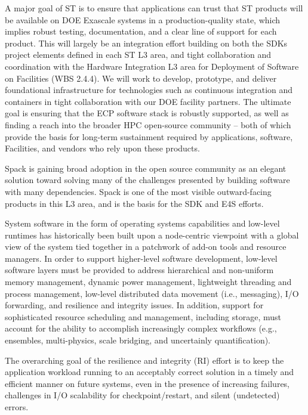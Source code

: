 A major goal of ST is to ensure that applications can trust that ST products will be available on DOE Exascale systems in a production-quality state, which implies robust testing, documentation, and a clear line of support for each product. This will largely be an integration effort building on both the SDKs project elements defined in each ST L3 area, and tight collaboration and coordination with the Hardware Integration L3 area for Deployment of Software on Facilities (WBS 2.4.4). We will work to develop, prototype, and deliver foundational infrastructure for technologies such as continuous integration and containers in tight collaboration with our DOE facility partners. The ultimate goal is ensuring that the ECP software stack is robustly supported, as well as finding a reach into the broader HPC open-source community – both of which provide the basis for long-term sustainment required by applications, software, Facilities, and vendors who rely upon these products.

Spack is gaining broad adoption in the open source community as an elegant solution toward solving many of the challenges presented by building software with many dependencies. Spack is one of the most visible outward-facing products in this L3 area, and is the basis for the SDK and E4S efforts.

System software in the form of operating systems capabilities and low-level runtimes has historically been built upon a node-centric viewpoint with a global view of the system tied together in a patchwork of add-on tools and resource managers. In order to support higher-level software development, low-level software layers must be provided to address hierarchical and non-uniform memory management, dynamic power management, lightweight threading and process management, low-level distributed data movement (i.e., messaging), I/O forwarding, and resilience and integrity issues. In addition, support for sophisticated resource scheduling and management, including storage, must account for the ability to accomplish increasingly complex workflows (e.g., ensembles, multi-physics, scale bridging, and uncertainly quantification). 

The overarching goal of the resilience and integrity (RI) effort is to keep the application workload running to an acceptably correct solution in a timely and efficient manner on future systems, even in the presence of increasing failures, challenges in I/O scalability for checkpoint/restart, and silent (undetected) errors.

